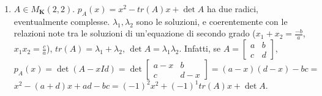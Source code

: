 \documentclass{article}
\begin{document}
\begin{enumerate}
\item $A\in M_{\mathbf{K}}\left( 2,2\right) $. $p_{A}\left( x\right)
=x^{2}-tr\left( A\right) x+\det A$ ha due radici, eventualmente complesse. $%
\lambda _{1},\lambda _{2}$ sono le soluzioni, e coerentemente con le
relazioni note tra le soluzioni di un'equazione di secondo grado ($%
x_{1}+x_{2}=\frac{-b}{a}$, $x_{1}x_{2}=\frac{c}{a}$), $tr\left( A\right)
=\lambda _{1}+\lambda _{2}$, $\det A=\lambda _{1}\lambda _{2}$. Infatti, se $%
A=\left[ 
\begin{array}{cc}
a & b \\ 
c & d%
\end{array}%
\right] $, $p_{A}\left( x\right) =\det \left( A-xId\right) =\det \left[ 
\begin{array}{cc}
a-x & b \\ 
c & d-x%
\end{array}%
\right] =\left( a-x\right) \left( d-x\right) -bc=$ $x^{2}-\left( a+d\right)
x+ad-bc=\left( -1\right) ^{2}x^{2}+\left( -1\right) ^{1}tr\left( A\right)
x+\det A$.


\end{enumerate}
\end{document}
